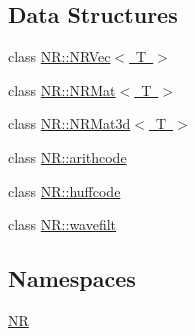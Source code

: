 \subsection*{Data Structures}
\begin{DoxyCompactItemize}
\item 
class \mbox{\hyperlink{classNR_1_1NRVec}{N\+R\+::\+N\+R\+Vec$<$ T $>$}}
\item 
class \mbox{\hyperlink{classNR_1_1NRMat}{N\+R\+::\+N\+R\+Mat$<$ T $>$}}
\item 
class \mbox{\hyperlink{classNR_1_1NRMat3d}{N\+R\+::\+N\+R\+Mat3d$<$ T $>$}}
\item 
class \mbox{\hyperlink{classNR_1_1arithcode}{N\+R\+::arithcode}}
\item 
class \mbox{\hyperlink{classNR_1_1huffcode}{N\+R\+::huffcode}}
\item 
class \mbox{\hyperlink{classNR_1_1wavefilt}{N\+R\+::wavefilt}}
\end{DoxyCompactItemize}
\subsection*{Namespaces}
\begin{DoxyCompactItemize}
\item 
 \mbox{\hyperlink{namespaceNR}{NR}}
\end{DoxyCompactItemize}
